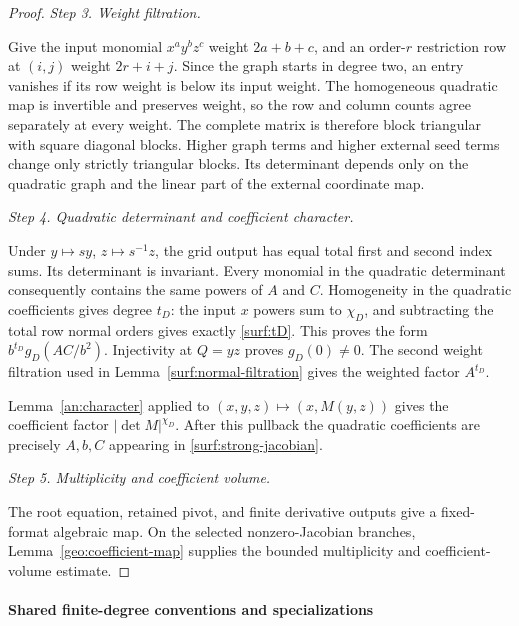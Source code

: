 \documentclass[11pt]{amsart}
\theoremstyle{definition}
\theoremstyle{remark}
\numberwithin{equation}{section}
\begin{document}
\begin{proof}
\par\medskip\noindent\textit{Step 3. Weight filtration.}\par\nobreak\smallskip
Give the input monomial $x^ay^bz^c$ weight $2a+b+c$, and an order-$r$ restriction row at $(i,j)$ weight $2r+i+j$. Since the graph starts in degree two, an entry vanishes if its row weight is below its input weight. The homogeneous quadratic map is invertible and preserves weight, so the row and column counts agree separately at every weight. The complete matrix is therefore block triangular with square diagonal blocks. Higher graph terms and higher external seed terms change only strictly triangular blocks. Its determinant depends only on the quadratic graph and the linear part of the external coordinate map.

\par\medskip\noindent\textit{Step 4. Quadratic determinant and coefficient character.}\par\nobreak\smallskip
Under $y\mapsto sy$, $z\mapsto s^{-1}z$, the grid output has equal total first and second index sums. Its determinant is invariant. Every monomial in the quadratic determinant consequently contains the same powers of $A$ and $C$. Homogeneity in the quadratic coefficients gives degree $t_D$: the input $x$ powers sum to $\chi_D$, and subtracting the total row normal orders gives exactly \eqref{surf:tD}. This proves the form $b^{t_D}g_D(AC/b^2)$. Injectivity at $Q=yz$ proves $g_D(0)\ne0$. The second weight filtration used in Lemma~\ref{surf:normal-filtration} gives the weighted factor $A^{t_D}$.

Lemma~\ref{an:character} applied to $(x,y,z)\mapsto(x,M(y,z))$ gives the coefficient factor $|\det M|^{\chi_D}$. After this pullback the quadratic coefficients are precisely $A,b,C$ appearing in \eqref{surf:strong-jacobian}.

\par\medskip\noindent\textit{Step 5. Multiplicity and coefficient volume.}\par\nobreak\smallskip
The root equation, retained pivot, and finite derivative outputs give a fixed-format algebraic map. On the selected nonzero-Jacobian branches, Lemma~\ref{geo:coefficient-map} supplies the bounded multiplicity and coefficient-volume estimate.
\end{proof}

\paragraph{Shared finite-degree conventions and specializations}
\end{document}
